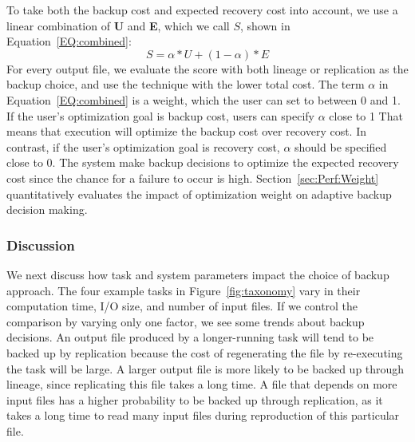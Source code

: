 \documentclass{sig-alternate}
\newcommand{\iannote}[1]{ {\textcolor{red}    { ***Ian:      #1 }}}
\newcommand{\zhaonote}[1]{{\textcolor{cyan}    { ***Zhao:      #1 }}}
\newcommand{\iannote}[1]{}
\newcommand{\zhaonote}[1]{}
\begin{document}
To take both the backup cost and expected recovery cost into account, we use a linear combination of {\bf U} and {\bf E}, which we call %
$S$, shown in Equation~\ref{EQ:combined}:
\begin{equation}
S=\alpha*U+(1-\alpha)*E
\label{EQ:combined}
\end{equation}
%
For every output file, we evaluate the score with both lineage or replication as the backup choice, and use the technique with the lower total cost.
The term $\alpha$ in Equation~\ref{EQ:combined} is a weight, which the user can set to between 0 and 1. 
 If the user's optimization goal is backup cost, users can specify $\alpha$ close to 1
That means that execution will optimize the backup cost over recovery cost. In contrast, if the user's optimization goal is recovery cost, $\alpha$ should be specified close to 0. The system make backup decisions to optimize the expected recovery cost since the chance for a failure to occur is high. Section~\ref{sec:Perf:Weight} quantitatively evaluates the impact of optimization weight on adaptive backup decision making. 

\subsubsection{Discussion}
We next discuss how task and system parameters impact the choice of backup approach.
The four example tasks in Figure~\ref{fig:taxonomy} vary in their computation time, I/O size, and number of input files. If we control the comparison by varying only one factor, we see some trends about backup decisions.
An output file produced by a longer-running task will tend to be backed up by replication because the cost of regenerating the file by re-executing the task will be large.
A larger output file is more likely to be backed up through lineage, since replicating this file takes a long time.
A file that depends on more input files has a higher probability to be backed up through replication, as it takes a long time to read many input files during reproduction of this particular file.
\end{document}
